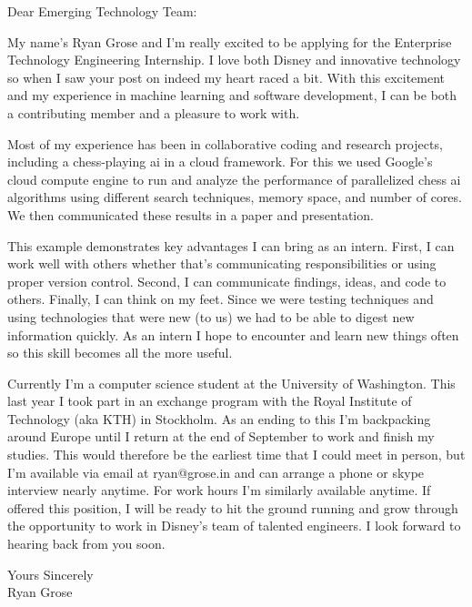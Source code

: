 \documentclass[a4paper,english]{friggeri-letter}
\begin{document}

\address{
   6200 Norma Beach Rd. \\
   Edmonds, WA 98026
}







\opening{Dear Emerging Technology Team:}

My name's Ryan Grose and I'm really excited to be applying for the Enterprise Technology Engineering Internship. I love both Disney and innovative technology so when I saw your post on indeed my heart raced a bit. With this excitement and my experience in machine learning and software development, I can be both a contributing member and a pleasure to work with.

Most of my experience has been in collaborative coding and research projects, including a chess-playing ai in a cloud framework. For this we used Google's cloud compute engine to run and analyze the performance of parallelized chess ai algorithms using different search techniques, memory space, and number of cores. We then communicated these results in a paper and presentation.

This example demonstrates key advantages I can bring as an intern. First, I can work well with others whether that's communicating responsibilities or using proper version control. Second, I can communicate findings, ideas, and code to others. Finally, I can think on my feet. Since we were testing techniques and using technologies that were new (to us) we had to be able to digest new information quickly. As an intern I hope to encounter and learn new things often so this skill becomes all the more useful.

Currently I'm a computer science student at the University of Washington. This last year I took part in an exchange program with the Royal Institute of Technology (aka KTH) in Stockholm. As an ending to this I'm backpacking around Europe until I return at the end of September to work and finish my studies. This would therefore be the earliest time that I could meet in person, but I'm available via email at ryan@grose.in and can arrange a phone or skype interview nearly anytime. For work hours I'm similarly available anytime. If offered this position, I will be ready to hit the ground running and grow through the opportunity to work in Disney's team of talented engineers. I look forward to hearing back from you soon.


\closing{
   Yours Sincerely\\
   Ryan Grose}
\end{document}
